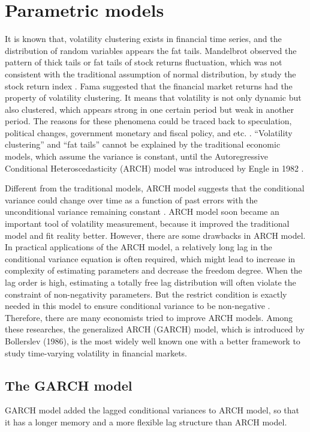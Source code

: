 \chapter{Parametric models}\label{secGarchmodel}
It is known that, volatility clustering exists in financial time series, and the distribution of random variables appears the fat tails. Mandelbrot observed the pattern of thick tails or fat tails of stock returns fluctuation, which was not consistent with the traditional assumption of normal distribution, by study the stock return index \citep{Mandelbrot1963}. 
Fama suggested that the financial market returns had the property of volatility clustering. It means that volatility is not only dynamic but also clustered, which appears strong in one certain period but weak in another period. The reasons for these phenomena could be traced back to speculation, political changes, government monetary and fiscal policy, and etc. \citep{EugeneF.Fama1965}. ``Volatility clustering'' and ``fat tails'' cannot be explained by the traditional economic models, which assume the variance is constant, until the Autoregressive Conditional Heteroscedasticity (ARCH) model was introduced by Engle in 1982 \citep{Bollerslev1992}.


Different from the traditional models, ARCH model suggests that the conditional variance could change over time as a function of past errors with the unconditional variance remaining constant \citep{Engle1982}. ARCH model soon became an important tool of volatility measurement, because it improved the traditional model and fit reality better. However, there are some drawbacks in ARCH model. In practical applications of the ARCH model, a relatively long lag in the conditional variance equation is often required, which might lead to increase in complexity of estimating parameters and decrease the freedom degree. When the lag order is high, estimating a totally free lag distribution will often violate the constraint of non-negativity parameters. But the restrict condition is exactly needed in this model to ensure conditional variance to be non-negative \citep{Bollerslev1986}. Therefore, there are many economists tried to improve ARCH models. Among these researches, the generalized ARCH (GARCH) model, which is introduced by Bollerslev (1986), is the most widely well known one with a better framework to study time-varying volatility in financial markets. 

\section{The GARCH model}
GARCH model added the lagged conditional variances to ARCH model, so that it has a longer memory and a more flexible lag structure than ARCH model.

